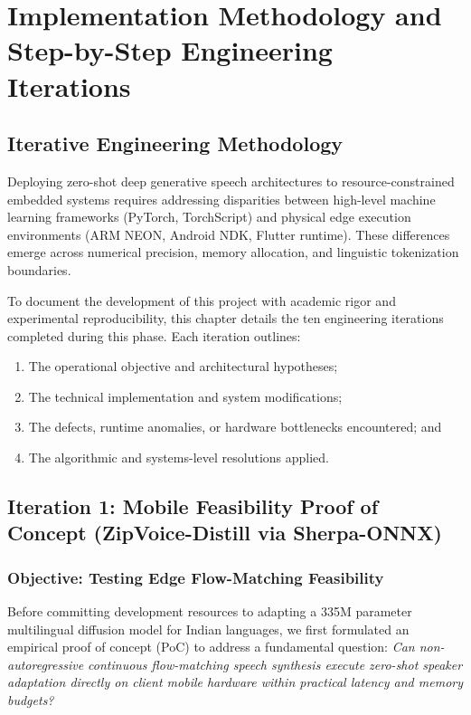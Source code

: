 \chapter{Implementation Methodology and Step-by-Step Engineering Iterations}
\label{Chapter4}

\section{Iterative Engineering Methodology}
Deploying zero-shot deep generative speech architectures to resource-constrained embedded systems requires addressing disparities between high-level machine learning frameworks (PyTorch, TorchScript) and physical edge execution environments (ARM NEON, Android NDK, Flutter runtime). These differences emerge across numerical precision, memory allocation, and linguistic tokenization boundaries.

To document the development of this project with academic rigor and experimental reproducibility, this chapter details the ten engineering iterations completed during this phase. Each iteration outlines:
\begin{enumerate}[label=(\roman*)]
    \item The operational objective and architectural hypotheses;
    \item The technical implementation and system modifications;
    \item The defects, runtime anomalies, or hardware bottlenecks encountered; and
    \item The algorithmic and systems-level resolutions applied.
\end{enumerate}

\section{Iteration 1: Mobile Feasibility Proof of Concept (ZipVoice-Distill via Sherpa-ONNX)}
\subsection{Objective: Testing Edge Flow-Matching Feasibility}
Before committing development resources to adapting a 335M parameter multilingual diffusion model for Indian languages, we first formulated an empirical proof of concept (PoC) to address a fundamental question: \textit{Can non-autoregressive continuous flow-matching speech synthesis execute zero-shot speaker adaptation directly on client mobile hardware within practical latency and memory budgets?}

